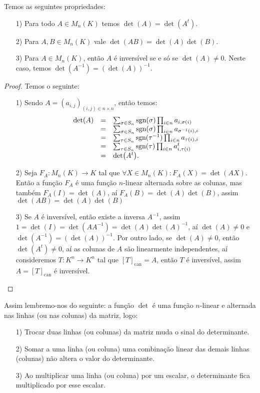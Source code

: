 \documentclass[11pt,twoside,a4paper]{book}
\begin{document}
\begin{proposicao}
Temos as seguintes propriedades:
\begin{itemize}
\item[1)] Para todo $A\in M_n(K)$ temos $\det(A)=\det(A^t)$.
\item[2)] Para $A,B\in M_n(K)$ vale $\det(AB)=\det(A)\det(B)$.
\item[3)] Para $A\in M_n(K)$, então $A$ é inversível se e só se $\det(A)\neq 0$. Neste caso, temos $\det(A^{-1})=(\det(A))^{-1}$.
\end{itemize}
\end{proposicao}
\begin{proof}
Temos o seguinte:
\begin{itemize}
\item[1)] Sendo $A=(a_{i,j})_{(i,j)\in n\times n}$, então temos:
\[
\begin{array}{rcl}
\det(A)&=&\sum_{\sigma\in S_n}\operatorname{\textrm{sgn}}(\sigma)\prod_{i\in n}a_{i,\sigma(i)}\\&=&\sum_{\sigma\in S_n}\operatorname{\textrm{sgn}}(\sigma)\prod_{i\in n}a_{\sigma^{-1}(i),i}\\&=&\sum_{\tau\in S_n}\operatorname{\textrm{sgn}}(\tau^{-1})\prod_{i\in n}a_{\tau(i),i}\\&=&\sum_{\tau\in S_n}\operatorname{\textrm{sgn}}(\tau)\prod_{i\in n}a^t_{i,\tau(i)}\\&=&\det(A^t).
\end{array}
\]
\item[2)] Seja $F_A:M_n(K)\rightarrow K$ tal que $\forall X\in M_n(K):F_A(X)=\det(AX)$. Então a função $F_A$ é uma função $n$-linear alternada sobre as colunas, mas também $F_A(I)=\det(A)$, aí $F_A(B)=\det(A)\det(B)$, assim $\det(AB)=\det(A)\det(B)$
\item[3)] Se $A$ é inversível, então existe a inversa $A^{-1}$, assim $1=\det(I)=\det(AA^{-1})=\det(A)\det(A)^{-1}$, aí $\det(A)\neq 0$ e $\det(A^{-1})=(\det(A))^{-1}$. Por outro lado, se $\det(A)\neq 0$, então $\det(A^t)\neq 0$, aí as colunas de $A$ são linearmente independentes, aí consideremos $T:K^n\rightarrow K^n$ tal que $[T]_{\mathrm{can}}=A$, então $T$ é inversível, assim $A=[T]_{\mathrm{can}}$ é inversível.
\end{itemize}
\end{proof}

\noindent
Assim lembremo-nos do seguinte: a função $\det$ é uma função $n$-linear e alternada nas linhas (ou nas colunas) da matriz, logo:
\begin{itemize}
\item[1)] Trocar duas linhas (ou colunas) da matriz muda o sinal do determinante.
\item[2)] Somar a uma linha (ou coluna) uma combinação linear das demais linhas (colunas) não altera o valor do determinante.
\item[3)] Ao multiplicar uma linha (ou coluna) por um escalar, o determinante fica multiplicado por esse escalar.
\end{itemize}
\end{document}

